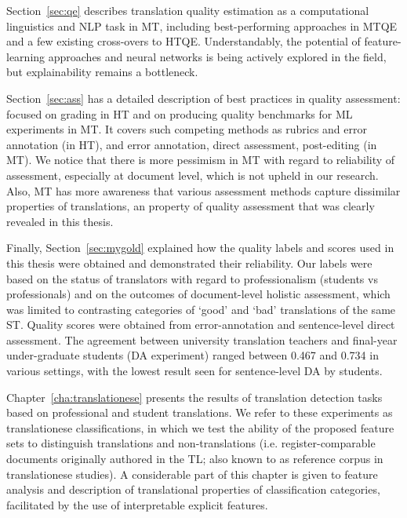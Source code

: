 Section~\ref{sec:qe} describes translation quality estimation as a computational linguistics and NLP task in MT, including best-performing approaches in MTQE and a few existing cross-overs to HTQE. Understandably, the potential of feature-learning approaches and neural networks is being actively explored in the field, but explainability remains a bottleneck. 

Section~\ref{sec:ass} has a detailed description of best practices in quality assessment: focused on grading in HT and on producing quality benchmarks for ML experiments in MT. It covers such competing methods as rubrics and error annotation (in HT), and error annotation, direct assessment, post-editing  (in MT). We notice that there is more pessimism in MT with regard to reliability of assessment, especially at document level, which is not upheld in our research. Also, MT has more awareness that various assessment methods capture dissimilar properties of translations, an property of quality assessment that was clearly revealed in this thesis. 

Finally, Section~\ref{sec:mygold} explained how the quality labels and scores used in this thesis were obtained and demonstrated their reliability. Our labels were based on the status of translators with regard to professionalism (students vs professionals) and on the outcomes of document-level holistic assessment, which was limited to contrasting categories of `good' and `bad' translations of the same ST. 
Quality scores were obtained from error-annotation and sentence-level direct assessment. 
The agreement between university translation teachers and final-year under-graduate students (DA experiment) ranged between 0.467 and 0.734 in various settings, with the lowest result seen for sentence-level DA by students.

Chapter~\ref{cha:translationese} presents the results of translation detection tasks based on professional and student translations. We refer to these experiments as translationese classifications, in which we test the ability of the proposed feature sets to distinguish translations and non-translations (i.e. register-comparable documents originally authored in the TL; also known to as reference corpus in translationese studies). A considerable part of this chapter is given to feature analysis and description of translational properties of classification categories, facilitated by the use of interpretable explicit features. 

